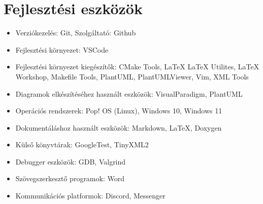 \documentclass{scrarticle}
\begin{document}
\section{Fejlesztési eszközök}
\begin{itemize}
    \item Verziókezelés: Git, Szolgáltató: Github
    \item Fejlesztési környezet: VSCode
    \item Fejlesztési környezet kiegészítők: CMake Tools, LaTeX LaTeX Utilites, LaTeX Workshop, Makefile Tools, PlantUML, PlantUMLViewer, Vim, XML Tools
    \item Diagramok elkészítéséhez használt eszközök: VisualParadigm, PlantUML
    \item Operációs rendszerek: Pop! OS (Linux), Windows 10, Windows 11
    \item Dokumentáláshoz használt eszközök: Markdown, LaTeX, Doxygen
    \item Külső könyvtárak: GoogleTest, TinyXML2
    \item Debugger eszközök: GDB, Valgrind
    \item Szövegszerkesztő programok: Word
    \item Kommunikációs platformok: Discord, Messenger
\end{itemize}
\end{document}
